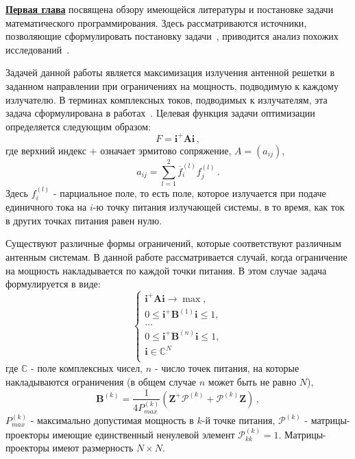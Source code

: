 \underline{\textbf{Первая глава}} посвящена обзору имеющейся литературы и постановке задачи математического программирования. Здесь рассматриваются источники, позволяющие сформулировать постановку задачи~\cite{sazonov:PAA, yurkov:farkv}, приводится анализ похожих исследований~\cite{luo:sdp}.

Задачей данной работы является максимизация излучения антенной решетки в заданном направлении при ограничениях на мощность, подводимую к каждому излучателю. В терминах комплексных токов, подводимых к излучателям, эта задача сформулирована в работах~\cite{yurkov:farkv,yurkov:knd}. Целевая функция задачи оптимизации определяется следующим образом:
%
    \begin{equation}
        F = \textbf{i}^{+}\textbf{Ai} \, ,
        \label{eq:F}
    \end{equation}
%
где верхний индекс $+$ означает эрмитово сопряжение, $A = (a_{ij})$,
%
     \begin{equation}
        a_{ij} = \sum_{l=1}^2\overline{f}_{i}^{(l)}f_{j}^{(l)}
        \label{eq:A} \, .
    \end{equation}
%
Здесь $f_i^{(l)}$ - парциальное поле, то есть поле, которое излучается при подаче единичного тока на $i$-ю точку питания излучающей системы, в то время, как ток в других точках питания равен нулю.

Существуют различные формы ограничений, которые соответствуют различным антенным системам. В данной работе рассматривается случай, когда ограничение на мощность накладывается по каждой точки питания. В этом случае задача формулируется в виде:
%
    \begin{equation}
        \begin{cases}
           \textbf{i}^{+}\textbf{Ai} \rightarrow \max,\\
           0 \leq \textbf{i}^{+}\textbf{B}^{(1)}\textbf{i} \leq 1, \\
           ...\\
           0 \leq \textbf{i}^{+}\textbf{B}^{(n)}\textbf{i} \leq 1,\\
           \textbf{i} \in \mathbb{C}^N\\
         \end{cases}
         \label{eq:task2}
    \end{equation}
%
где $\mathbb{C}$ - поле комплексных чисел, $n$ - число точек питания, на которые накладываются ограничения (в общем случае $n$ может быть не равно $N$),
%
    \begin{equation}
        \textbf{B}^{(k)} = \frac{1}{4P_{max}^{(k)}}(\textbf{Z}^{+}\mathcal{P}^{(k)} + \mathcal{P}^{(k)}\textbf{Z}) \, ,
    \end{equation}
%
$P_{max}^{(k)}$ - максимально допустимая мощность в $k$-й точке питания, $\mathcal{P}^{(k)}$ - матрицы-проекторы имеющие единственный ненулевой элемент $\mathcal{P}^{(k)}_{kk}=1$. Матрицы-проекторы имеют размерность $N \times N$.


